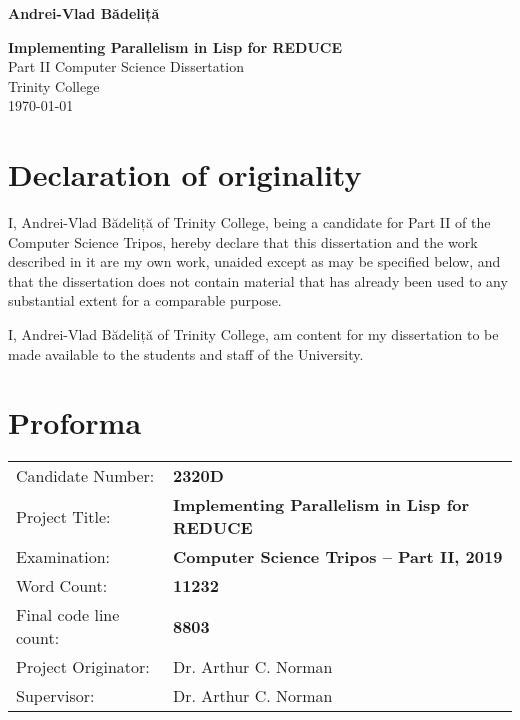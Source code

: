 \documentclass[a4paper,12pt,twoside,openright]{report}
\date{\today}
\title{}
\begin{document}

\hfill{\LARGE \bf Andrei-Vlad Bădeliță}

\pagestyle{empty}

\vspace*{60mm}
\begin{center}
\Huge{\bf Implementing Parallelism in Lisp for REDUCE} \\
\vspace*{5mm}
Part II Computer Science Dissertation \\
\vspace*{5mm}
Trinity College \\
\vspace*{5mm}
\today  %
\end{center}

\cleardoublepage


\pagestyle{plain}

\section*{Declaration of originality}

I, Andrei-Vlad Bădeliță of Trinity College, being a candidate for Part II of the
Computer Science Tripos, hereby declare that this dissertation and the work described
in it are my own work, unaided except as may be specified below, and that the
dissertation does not contain material that has already been used to any
substantial extent for a comparable purpose.

\medskip
\noindent
I, Andrei-Vlad Bădeliță of Trinity College, am content for my dissertation
to be made available to the students and staff of the University.

\bigskip
{}

\medskip
{}

\section*{Proforma}

{\large
\begin{tabular}{ll}
Candidate Number:   & \bf 2320D \\
Project Title:      & \bf Implementing Parallelism in Lisp for REDUCE \\
Examination:        & \bf Computer Science Tripos -- Part II, 2019  \\
Word Count:         & \bf 11232         \\
Final code line count: & \bf 8803        \\
Project Originator: & Dr. Arthur C. Norman                    \\
Supervisor:         & Dr. Arthur C. Norman                    \\
\end{tabular}
}
\end{document}
